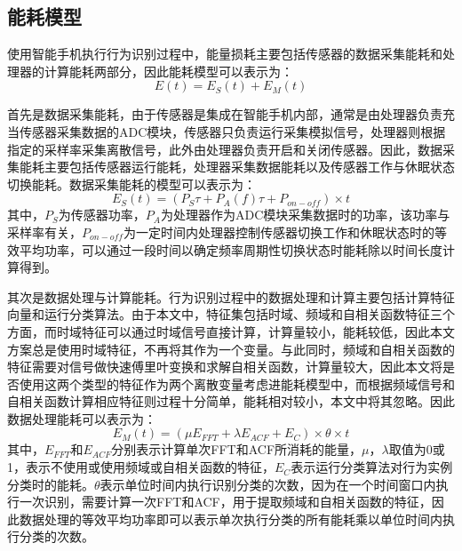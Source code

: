 \subsection{能耗模型}
\par 使用智能手机执行行为识别过程中，能量损耗主要包括传感器的数据采集能耗和处理器的计算能耗两部分，因此能耗模型可以表示为：
\begin{equation}
	E(t) = E_S(t) + E_M(t)
\end{equation}
\par 首先是数据采集能耗，由于传感器是集成在智能手机内部，通常是由处理器负责充当传感器采集数据的ADC模块，传感器只负责运行采集模拟信号，处理器则根据指定的采样率采集离散信号，此外由处理器负责开启和关闭传感器。因此，数据采集能耗主要包括传感器运行能耗，处理器采集数据能耗以及传感器工作与休眠状态切换能耗。数据采集能耗的模型可以表示为：
\begin{equation}
	E_S(t) = (P_S\tau + P_A(f)\tau + P_{on-off}) \times t
\end{equation}
其中，$P_S$为传感器功率，$P_A$为处理器作为ADC模块采集数据时的功率，该功率与采样率有关，$P_{on-off}$为一定时间内处理器控制传感器切换工作和休眠状态时的等效平均功率，可以通过一段时间以确定频率周期性切换状态时能耗除以时间长度计算得到。
\par 其次是数据处理与计算能耗。行为识别过程中的数据处理和计算主要包括计算特征向量和运行分类算法。由于本文中，特征集包括时域、频域和自相关函数特征三个方面，而时域特征可以通过时域信号直接计算，计算量较小，能耗较低，因此本文方案总是使用时域特征，不再将其作为一个变量。与此同时，频域和自相关函数的特征需要对信号做快速傅里叶变换和求解自相关函数，计算量较大，因此本文将是否使用这两个类型的特征作为两个离散变量考虑进能耗模型中，而根据频域信号和自相关函数计算相应特征则过程十分简单，能耗相对较小，本文中将其忽略。因此数据处理能耗可以表示为：
\begin{equation}
	E_M(t) = (\mu E_{FFT} + \lambda E_{ACF} + E_C) \times \theta \times t
\end{equation}
其中，$E_{FFT}$和$E_{ACF}$分别表示计算单次FFT和ACF所消耗的能量，$\mu$，$\lambda$取值为0或1，表示不使用或使用频域或自相关函数的特征，$E_C$表示运行分类算法对行为实例分类时的能耗。$\theta$表示单位时间内执行识别分类的次数，因为在一个时间窗口内执行一次识别，需要计算一次FFT和ACF，用于提取频域和自相关函数的特征，因此数据处理的等效平均功率即可以表示单次执行分类的所有能耗乘以单位时间内执行分类的次数。 
